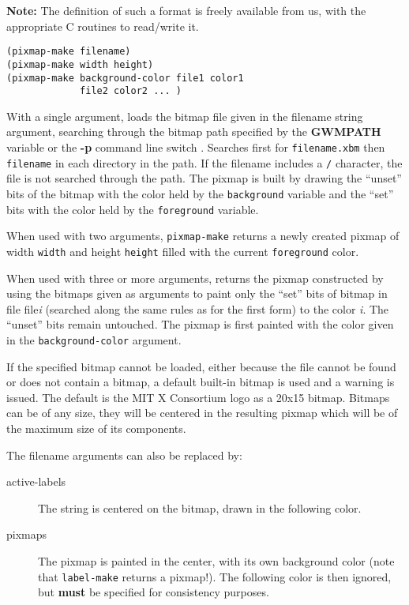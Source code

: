 {\bf Note:} The definition of such a format is freely available from us,
with the appropriate C routines to read/write it.

        
{\usagefont\begin{verbatim}
(pixmap-make filename)
(pixmap-make width height)
(pixmap-make background-color file1 color1 
             file2 color2 ... )
\end{verbatim}}\usageupspace

With a single argument, loads the bitmap file given in the filename string
argument, searching through the bitmap path specified by the {\bf GWMPATH}
variable or the {\bf -p} command line switch . 
Searches first for
\verb"filename.xbm" then \verb"filename" in each directory in the path. If
the filename includes a \verb"/" character, the file is not searched through
the path.
The pixmap is built by drawing the ``unset'' bits of the bitmap with the 
color held by the \verb"background" variable and  the ``set'' bits with
the color held by the \verb"foreground" variable.

When used with two arguments, \verb"pixmap-make" returns a newly
created pixmap of width \verb"width" and height \verb"height" filled with
the current \verb"foreground" color.

When used with three or more arguments,
returns the pixmap constructed by using the bitmaps given as arguments to
paint only the ``set'' bits of bitmap in file file{\it i}
(searched along the same rules as for the first form) to the color{\it
i}.  The ``unset'' bits remain untouched. The pixmap is first painted with the
color given in the \verb"background-color" argument.

If the specified bitmap cannot be loaded, either because the file cannot be
found or does not contain a bitmap, a default built-in bitmap is used and a
warning is issued. The default is the MIT X Consortium logo as a 20x15 bitmap.
Bitmaps can be of any size, they will be centered in the resulting pixmap
which will be of the maximum size of its components.

The filename arguments can also be replaced by:

\begin{description} 

\item[active-labels] The string is centered on the bitmap, drawn in the
following color.

\item[pixmaps]      The pixmap is painted in the center, with its own
background color (note that \verb"label-make" returns a pixmap!). The
following color is then ignored, but {\bf must} be specified for consistency
purposes.

\end{description}



